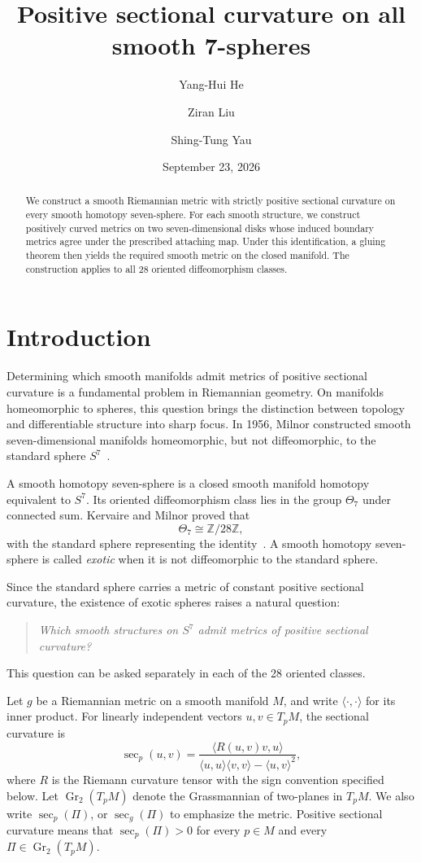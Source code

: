 \documentclass[12pt]{amsart}
\title[Positive curvature on all smooth 7-spheres]{Positive sectional curvature on all smooth 7-spheres}
\author[Y.-H. He]{Yang-Hui He}
\author[Z. Liu]{Ziran Liu}
\author[S.-T. Yau]{Shing-Tung Yau}
\date{September 23, 2026}
\numberwithin{equation}{section}
\theoremstyle{remark}
\newcommand{\Gr}{\operatorname{Gr}}
\newcommand{\Ksec}{\operatorname{sec}}
\begin{document}
\begin{abstract}
We construct a smooth Riemannian metric with strictly positive sectional curvature on every smooth homotopy seven-sphere. For each smooth structure, we construct positively curved metrics on two seven-dimensional disks whose induced boundary metrics agree under the prescribed attaching map. Under this identification, a gluing theorem then yields the required smooth metric on the closed manifold. The construction applies to all 28 oriented diffeomorphism classes.
\end{abstract}
\maketitle

\section{Introduction}

Determining which smooth manifolds admit metrics of positive sectional
curvature is a fundamental problem in Riemannian geometry. On manifolds
homeomorphic to spheres, this question brings the distinction between
topology and differentiable structure into sharp focus. In 1956,
Milnor constructed smooth seven-dimensional manifolds homeomorphic, but
not diffeomorphic, to the standard sphere \(S^7\)~\cite{Milnor}.

A smooth homotopy seven-sphere is a closed smooth manifold homotopy
equivalent to \(S^7\). Its oriented diffeomorphism class lies in the group \(\Theta_7\) under connected sum.
Kervaire and Milnor proved that
\[
 \Theta_7\cong\mathbb Z/28\mathbb Z,
\]
with the standard sphere representing the identity~\cite{KM}.
A smooth homotopy seven-sphere is called \emph{exotic}
when it is not diffeomorphic to the standard sphere.

Since the standard sphere carries a metric of constant positive
sectional curvature, the existence of exotic spheres raises a natural
question:
\begin{quote}
\emph{Which smooth structures on \(S^7\) admit metrics of positive
sectional curvature?}
\end{quote}
This question can be asked separately in each of the 28 oriented classes.

Let \(g\) be a Riemannian metric on a smooth manifold \(M\), and write
\(\langle\cdot,\cdot\rangle\) for its inner product. For linearly
independent vectors \(u,v\in T_pM\), the sectional curvature is
\[
\Ksec_p(u,v)=
\frac{\langle R(u,v)v,u\rangle}
{\langle u,u\rangle\langle v,v\rangle-\langle u,v\rangle^2},
\]
where \(R\) is the Riemann curvature tensor with the sign convention
specified below. Let \(\Gr_2(T_pM)\) denote the Grassmannian of
two-planes in \(T_pM\). We also write \(\Ksec_p(\Pi)\), or
\(\Ksec_g(\Pi)\) to emphasize the metric. Positive sectional curvature
means that \(\Ksec_p(\Pi)>0\) for every \(p\in M\) and every
\(\Pi\in\Gr_2(T_pM)\).
\end{document}
